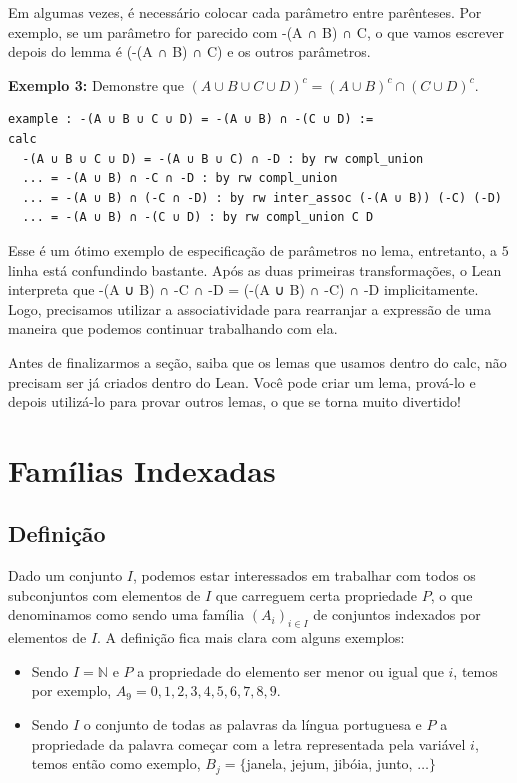 Em algumas vezes, é necessário colocar cada parâmetro entre parênteses. Por exemplo, se um parâmetro for parecido com {\selectfont -(A ∩ B) ∩ C}, o que vamos escrever depois do lemma é {\selectfont (-(A ∩ B) ∩ C)} e os outros parâmetros.

\textbf{Exemplo 3:} Demonstre que $(A \cup B \cup C \cup D)^c = (A \cup B)^c \cap (C \cup D)^c$.

\begin{lstlisting}
example : -(A ∪ B ∪ C ∪ D) = -(A ∪ B) ∩ -(C ∪ D) :=
calc
  -(A ∪ B ∪ C ∪ D) = -(A ∪ B ∪ C) ∩ -D : by rw compl_union
  ... = -(A ∪ B) ∩ -C ∩ -D : by rw compl_union
  ... = -(A ∪ B) ∩ (-C ∩ -D) : by rw inter_assoc (-(A ∪ B)) (-C) (-D)
  ... = -(A ∪ B) ∩ -(C ∪ D) : by rw compl_union C D \end{lstlisting}

Esse é um ótimo exemplo de especificação de parâmetros no lema, entretanto, a $5$ linha está confundindo bastante. Após as duas primeiras transformações, o Lean interpreta que {\selectfont -(A ∪ B) ∩ -C ∩ -D = (-(A ∪ B) ∩ -C) ∩ -D} implicitamente. Logo, precisamos utilizar a associatividade para rearranjar a expressão de uma maneira que podemos continuar trabalhando com ela.

Antes de finalizarmos a seção, saiba que os lemas que usamos dentro do {\selectfont calc}, não precisam ser já criados dentro do Lean. Você pode criar um lema, prová-lo e depois utilizá-lo para provar outros lemas, o que se torna muito divertido!
\section{Famílias Indexadas}
\subsection{Definição}
Dado um conjunto $I$, podemos estar interessados em trabalhar com todos os subconjuntos com elementos de $I$ que carreguem certa propriedade $P$, o que denominamos como sendo uma família $(A_i)_{i\in I}$ de conjuntos indexados por elementos de $I$.
A definição fica mais clara com alguns exemplos:

\begin{itemize}
  \item Sendo $I=\mathbb{N}$ e $P$ a propriedade do elemento ser menor ou igual que $i$, temos por exemplo, $A_{9}={0,1,2,3,4,5,6,7,8,9}$.
  \item Sendo $I$ o conjunto de todas as palavras da língua portuguesa e $P$ a propriedade da palavra começar com a letra representada pela variável $i$, temos então como exemplo, $B_j=\{$janela, jejum, jibóia, junto, $\dots\}$
\end{itemize}

